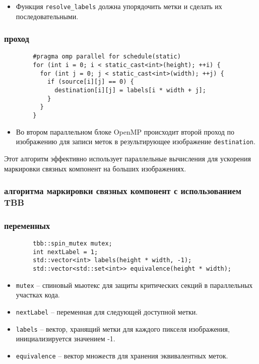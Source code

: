 \documentclass[a4paper, 14pt]{article}
\begin{document}
        \begin{itemize}
          \item Функция \texttt{resolve\_labels} должна упорядочить метки и сделать их последовательными.
        \end{itemize}
        
        \subsubsection*{ проход}
        
        \begin{verbatim}
        #pragma omp parallel for schedule(static)
        for (int i = 0; i < static_cast<int>(height); ++i) {
          for (int j = 0; j < static_cast<int>(width); ++j) {
            if (source[i][j] == 0) {
              destination[i][j] = labels[i * width + j];
            }
          }
        }
        \end{verbatim}
        
        \begin{itemize}
          \item Во втором параллельном блоке OpenMP происходит второй проход по изображению для записи меток в результирующее изображение \texttt{destination}.
        \end{itemize}
        
        Этот алгоритм эффективно использует параллельные вычисления для ускорения маркировки связных компонент на больших изображениях.

        \newpage
        \subsubsection*{ алгоритма маркировки связных компонент с использованием TBB}
        \subsubsection*{ переменных}

        \begin{verbatim}
        tbb::spin_mutex mutex;
        int nextLabel = 1;
        std::vector<int> labels(height * width, -1);
        std::vector<std::set<int>> equivalence(height * width);
        \end{verbatim}
        
        \begin{itemize}
          \item \texttt{mutex} – спиновый мьютекс для защиты критических секций в параллельных участках кода.
          \item \texttt{nextLabel} – переменная для следующей доступной метки.
          \item \texttt{labels} – вектор, хранящий метки для каждого пикселя изображения, инициализируется значением -1.
          \item \texttt{equivalence} – вектор множеств для хранения эквивалентных меток.
        \end{itemize}
        
\end{document}
